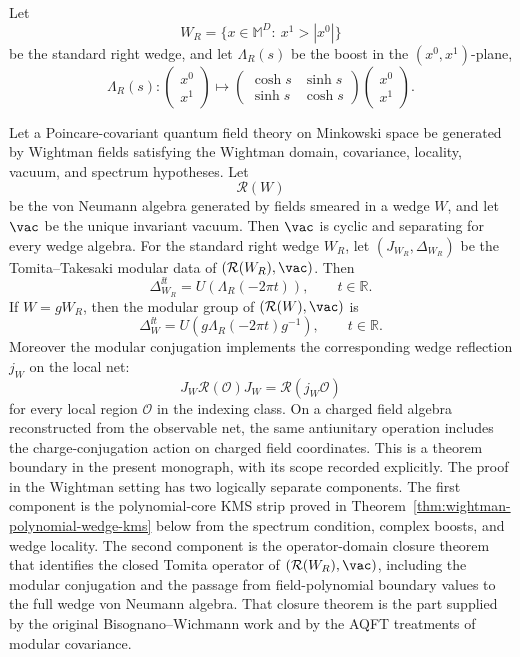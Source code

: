 Let
\[
  W_R=\{x\in\mathbb M^D:\ x^1>|x^0|\}
\]
be the standard right wedge, and let \(\Lambda_R(s)\) be the boost in the
\((x^0,x^1)\)-plane,
\[
  \Lambda_R(s):
  \begin{pmatrix}x^0\\ x^1\end{pmatrix}
  \longmapsto
  \begin{pmatrix}
    \cosh s & \sinh s\\
    \sinh s & \cosh s
  \end{pmatrix}
  \begin{pmatrix}x^0\\ x^1\end{pmatrix}.
\]
\begin{remark}
\label{rem:bisognano-wichmann-wedges-boundary}
Let a Poincare-covariant quantum field theory on Minkowski space be generated
by Wightman fields satisfying the Wightman domain, covariance, locality,
vacuum, and spectrum hypotheses.  Let
\[
  \mathcal R(W)
\]
be the von Neumann algebra generated by fields smeared in a wedge \(W\), and
let \(\vac\) be the unique invariant vacuum.  Then \(\vac\) is cyclic and
separating for every wedge algebra.  For the standard right wedge \(W_R\), let
\((J_{W_R},\Delta_{W_R})\) be the Tomita--Takesaki modular data of
\((\mathcal R(W_R),\vac)\).  Then
\[
  \Delta_{W_R}^{\ii t}=U(\Lambda_R(-2\pi t)),
  \qquad t\in\mathbb R.
\]
If \(W=gW_R\), then the modular group of \((\mathcal R(W),\vac)\) is
\[
  \Delta_W^{\ii t}
  =
  U\!\left(g\Lambda_R(-2\pi t)g^{-1}\right),
  \qquad t\in\mathbb R.
\]
Moreover the modular conjugation implements the corresponding wedge reflection
\(j_W\) on the local net:
\[
  J_W\mathcal R(\mathcal O)J_W=\mathcal R(j_W\mathcal O)
\]
for every local region \(\mathcal O\) in the indexing class.
On a charged field algebra reconstructed from the observable net, the same
antiunitary operation includes the charge-conjugation action on charged field
coordinates.
This is a theorem boundary in the present monograph, with its scope recorded
explicitly.  The proof in the Wightman setting has two logically separate
components.  The first component is the polynomial-core KMS strip
proved in Theorem~\ref{thm:wightman-polynomial-wedge-kms} below from the
spectrum condition, complex boosts, and wedge locality.  The second component
is the operator-domain closure theorem that identifies the closed Tomita
operator of \((\mathcal R(W_R),\vac)\), including the modular conjugation and
the passage from field-polynomial boundary values to the full wedge von
Neumann algebra.  That closure theorem is the part supplied by the original
Bisognano--Wichmann work and by the AQFT treatments of modular covariance.
\end{remark}

